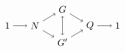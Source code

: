 \begin{equation}
    \begin{tikzpicture}
        \node (A) at (-2,0) {$1$};
        \node (B) at (-1,0) {$N$};
        \draw[->] (A) -- (B);
        \node (C) at (0, 0.6) {$G$};
        \node (D) at (0, -0.6) {$G'$};
        \draw [<->] (C) -- (D);
        \draw [->] (B) -- (C);
        \draw [->] (B) -- (D);
        \node (E) at (1, 0) {$Q$};
        \draw [->] (C) -- (E);
        \draw [->] (D) -- (E);
        \node (F) at (2, 0) {$1$};
        \draw [->] (E) -- (F);
    \end{tikzpicture}
\end{equation}